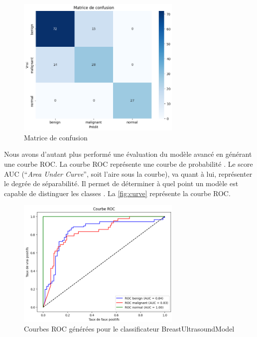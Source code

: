 \documentclass[a4paper,12pt]{article}
\begin{document}
\begin{figure}[h]
\centering
\includegraphics[width=0.7\textwidth]{confusion_matrix.png}
\caption{Matrice de confusion}
\label{fig:confusionmatrix}
\end{figure}

Nous avons d'autant plus performé une évaluation du modèle avancé en générant une courbe ROC. La courbe ROC représente une courbe de probabilité \cite{narkhede2018understanding}.
Le score AUC (\enquote{\textit{Area Under Curve}}, soit l'aire sous la courbe), va quant à lui, représenter le degrée de séparabilité. Il permet de déterminer à quel point un modèle est capable de distinguer les classes \cite{narkhede2018understanding}. La \autoref{fig:curve} représente la courbe ROC.
\clearpage

\begin{figure}[h]
\centering
\includegraphics[width=0.7\textwidth]{roc_curve.png}
\caption{Courbes ROC générées pour le classificateur BreastUltrasoundModel}
\label{fig:curve}
\end{figure}
\end{document}
